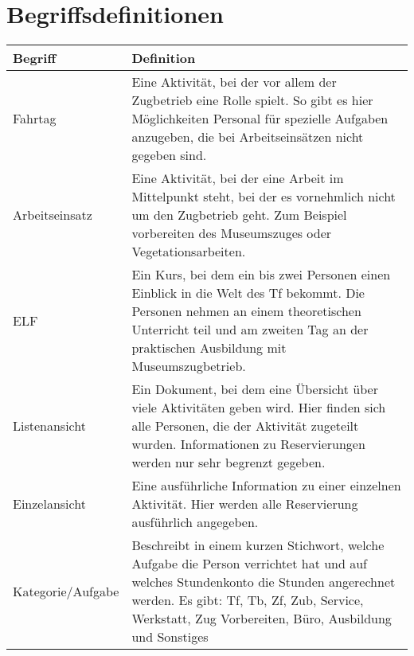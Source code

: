 \chapter{Begriffsdefinitionen}
\begin{tabularx}{\textwidth}{l|X}
  Begriff	& Definition \\
  \hline
  \hline
  Fahrtag	&
    Eine Aktivität, bei der vor allem der Zugbetrieb eine Rolle spielt.
    So gibt es hier Möglichkeiten Personal für spezielle Aufgaben anzugeben, die bei Arbeitseinsätzen nicht gegeben sind.\\
  \hline
  Arbeitseinsatz &
    Eine Aktivität, bei der eine Arbeit im Mittelpunkt steht, bei der es vornehmlich nicht um den Zugbetrieb geht.
    Zum Beispiel vorbereiten des Museumszuges oder Vegetationsarbeiten. \\
  \hline
  ELF &
    Ein Kurs, bei dem ein bis zwei Personen einen Einblick in die Welt des Tf bekommt.
    Die Personen nehmen an einem theoretischen Unterricht teil und am zweiten Tag an der praktischen Ausbildung mit Museumszugbetrieb.\\
  \hline
  Listenansicht &
    Ein Dokument, bei dem eine Übersicht über viele Aktivitäten geben wird.
    Hier finden sich alle Personen, die der Aktivität zugeteilt wurden.
    Informationen zu Reservierungen werden nur sehr begrenzt gegeben. \\
  \hline
  Einzelansicht &
  	Eine ausführliche Information zu einer einzelnen Aktivität.
    Hier werden alle Reservierung ausführlich angegeben. \\
  \hline
  Kategorie/Aufgabe &
  	Beschreibt in einem kurzen Stichwort, welche Aufgabe die Person verrichtet hat und auf welches Stundenkonto die Stunden angerechnet werden.
    Es gibt: Tf, Tb, Zf, Zub, Service, Werkstatt, Zug Vorbereiten, Büro, Ausbildung und Sonstiges
\end{tabularx}
